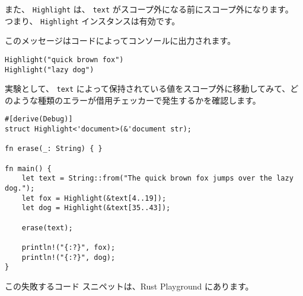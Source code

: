 また、 \texttt{Highlight} は、 \texttt{text} がスコープ外になる前にスコープ外になります。 つまり、 \texttt{Highlight} インスタンスは有効です。

このメッセージはコードによってコンソールに出力されます。


\begin{lstlisting}[numbers=none]
Highlight("quick brown fox")
Highlight("lazy dog")
\end{lstlisting}

実験として、 \texttt{text} によって保持されている値をスコープ外に移動してみて、どのような種類のエラーが借用チェッカーで発生するかを確認します。

\begin{lstlisting}[numbers=none]
#[derive(Debug)]
struct Highlight<'document>(&'document str);

fn erase(_: String) { }

fn main() {
    let text = String::from("The quick brown fox jumps over the lazy dog.");
    let fox = Highlight(&text[4..19]);
    let dog = Highlight(&text[35..43]);

    erase(text);

    println!("{:?}", fox);
    println!("{:?}", dog);
}
\end{lstlisting}

この失敗するコード スニペットは、Rust Playground にあります。


